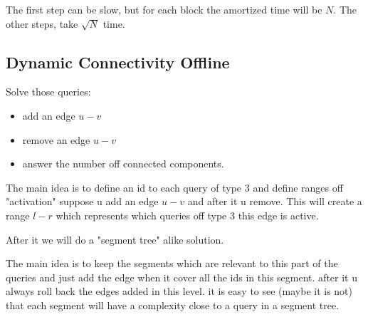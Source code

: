 The first step can be slow, but for each block the amortized time will be $N$. The other steps, take $\sqrt{N}$ time.


\subsection{Dynamic Connectivity Offline}

Solve those queries:
\begin{itemize}
    \item add an edge $u - v$
    \item remove an edge $u - v$
    \item answer the number off connected components.
\end{itemize}

The main idea is to define an id to each query of type $3$ and define ranges off "activation" suppose u add an edge $u - v$ and after it u remove. This will create a range $l - r$ which represents which queries off type $3$ this edge is active.

After it we will do a "segment tree" alike solution.

The main idea is to keep the segments which are relevant to this part of the queries and just add the edge when it cover all the ids in this segment. after it u always roll back the edges added in this level. it is easy to see (maybe it is not) that each segment will have a complexity close to a query in a segment tree.


